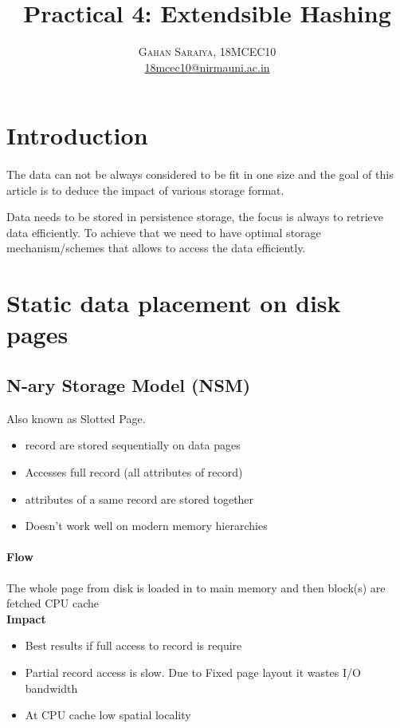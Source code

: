 \documentclass[paper=letter, fontsize=12pt]{article}
\title{\vspace{-15mm}\fontsize{24pt}{10pt}\selectfont\textbf{Practical 4: Extendsible Hashing}} %
\author{
\large
{\textsc{Gahan Saraiya, 18MCEC10 }}\\[2mm]
\normalsize \href{mailto:18mcec10@nirmauni.ac.in}{18mcec10@nirmauni.ac.in}\\[2mm] %
}
\date{}
\begin{document}
\maketitle %
\thispagestyle{fancy} %

\newcommand*\tick{\item[\Checkmark]}
\newcommand*\arrow{\item[$\Rightarrow$]}
\newcommand*\fail{\item[\XSolidBrush]}

\section{Introduction}
\paragraph{}
The data can not be always considered to be fit in one size and the goal of this article is to deduce the impact of various storage format. 

Data needs to be stored in persistence storage, the focus is always to retrieve data efficiently.
To achieve that we need to have optimal storage mechanism/schemes that allows to access the data efficiently.   


\section{Static data placement on disk pages}
\subsection{N-ary Storage Model (NSM)}
	Also known as Slotted Page.
	\begin{itemize}
		\item record are stored sequentially on data pages
		\item Accesses full record (all attributes of record)
		\tick attributes of a same record are stored together
		\fail Doesn't work well on modern memory hierarchies
	\end{itemize}
	
	\paragraph{Flow}The whole page from disk is loaded in to main memory and then block(s) are fetched CPU cache
	\\
	\textbf{Impact}
	\begin{itemize}
		\tick Best results if full access to record is require
		\fail Partial record access is slow. Due to Fixed page layout it wastes I/O bandwidth
		\fail At CPU cache low spatial locality
	\end{itemize}
\end{document}
